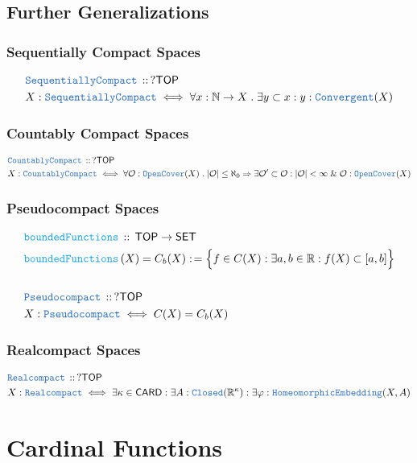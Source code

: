 \documentclass[12pt]{scrartcl}
\newcommand{\TYPE}[1]{\textcolor{NavyBlue}{\mathtt{#1}}}
\newcommand{\FUNC}[1]{\textcolor{Cerulean}{\mathtt{#1}}}
\renewcommand{\.}{\; . \;}
\newcommand{\de}{: \kern 0.1pc =}
\newcommand{\Act}[1]{\left( #1 \right)}
\newcommand{\DeclareType}[2]{& \TYPE{#1} \, :: \, #2 \\}
\newcommand{\DefineType}[3]{& #1 : \TYPE{#2} \iff #3 \\}
\newcommand{\DeclareFunc}[2]{& \FUNC{#1} \, :: \, #2 \\}
\newcommand{\DefineNamedFunc}[4]{&  \FUNC{#1}\Act{#2} = #3 \de #4 \\}
\newcommand{\Page}[1]{ \begin{align*} #1 \end{align*}   }
\renewcommand{\And}{\; \& \;}
\newcommand{\Imply}{\Rightarrow}
\newcommand{\Reals}{\mathbb{R} }
\newcommand{\Nat}{\mathbb{N} }
\newcommand{\SET}{\mathsf{SET}}
\newcommand{\TOP}{\mathsf{TOP}}
\begin{document}
\subsection{Further Generalizations}
\subsubsection{Sequentially Compact Spaces }
\Page{
	\DeclareType{SequentiallyCompact}{?\TOP}
	\DefineType{X}{SequentiallyCompact}{\forall x : \Nat \to X \. \exists y \subset x : y : \TYPE{Convergent}(X)}
}
\newpage
\subsubsection{Countably Compact Spaces}
\Page{
	\DeclareType{CountablyCompact}{?\TOP}
	\DefineType{X}{CountablyCompact}{\forall \mathcal{O} : \TYPE{OpenCover}(X) \. |\mathcal{O}| \le \aleph_0 \Imply \exists \mathcal{O}' \subset \mathcal{O} : |\mathcal{O}| < \infty \And \mathcal{O} : \TYPE{OpenCover}(X) }
}
\newpage
\subsubsection{Pseudocompact Spaces}
\Page{
	\DeclareFunc{boundedFunctions}{\TOP \to \SET}
	\DefineNamedFunc{boundedFunctions}{X}{C_b(X)}{\Big\{ f \in C(X) : \exists a,b \in \Reals : f(X) \subset [a,b] \Big\}}
	\\
	\DeclareType{Pseudocompact}{?\TOP}
	\DefineType{X}{Pseudocompact}{ C(X)  = C_b(X)}
}
\newpage
\subsubsection{Realcompact Spaces}
\Page{
	\DeclareType{Realcompact}{?\TOP}
	\DefineType{X}{Realcompact}{\exists \kappa \in \mathsf{CARD} : \exists A : \TYPE{Closed}(\Reals^\kappa) : \exists \varphi : \TYPE{HomeomorphicEmbedding}(X,A)}
}
\newpage
\section{Cardinal Functions}
\end{document}

